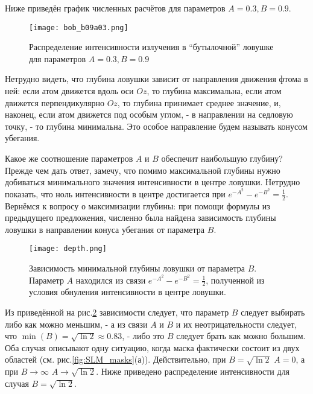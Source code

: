 \documentclass[12pt]{article}
\begin{document}
        Ниже приведён график численных расчётов для параметров $A = 0.3, B = 0.9$.
        \begin{figure}
            \center
            \texttt{[image: bob\_b09a03.png]}
            \caption{Распределение интенсивности излучения в \enquote{бутылочной} ловушке для параметров
                $A = 0.3, B = 0.9$}
            \label{fig:BOB a=0.3, b=0.9}
        \end{figure}
        Нетрудно видеть, что глубина ловушки зависит от направления движения фтома в ней: если атом движется вдоль
        оси $Oz$, то глубина максимальна, если атом движется перпендикулярно $Oz$, то глубина принимает среднее значение,
        и, наконец, если атом движется под особым углом, - в направлении на седловую точку, - то глубина минимальна.
        Это особое направление будем называть конусом убегания.

        Какое же соотношение параметров $A$ и $B$ обеспечит наибольшую глубину? Прежде чем дать ответ, замечу, что
        помимо максимальной глубины нужно добиваться минимального значения интенсивности в центре ловушки. Нетрудно показать,
        что ноль интенсивности в центре достигается при $e^{-A^2} - e^{-B^2}= \frac12$. Вернёмся к вопросу о максимизации
        глубины: при помощи формулы из предыдущего предложения, численно была найдена зависимость глубины ловушки
        в направлении конуса убегания от параметра $B$.

        \begin{figure}
            \center
            \texttt{[image: depth.png]}
            \caption{Зависимость минимальной глубины ловушки от параметра $B$. Параметр $A$ находился из связи
            $e^{-A^2} - e^{-B^2}= \frac12$, полученной из условия обнуления интенсивности в центре ловушки.}
            \label{fig:depth}
        \end{figure}

        Из приведённой на рис.\ref{fig:depth} зависимости следует, что параметр $B$ следует выбирать либо
        как можно меньшим, - а из связи $A$ и $B$ и их неотрицательности следует, что
        $\min{(B)}=\sqrt{\ln2} \approx 0.83$, - либо это $B$ следует брать как можно большим. Оба случая описывают одну
        ситуацию, когда маска фактически состоит из двух областей (см. рис.\ref{fig:SLM_masks}(а)). Действительно, при $B=\sqrt{\ln2}$ $A=0$,
        а при $B \rightarrow \infty$ $A \rightarrow \sqrt{\ln2}$. Ниже приведено распределение интенсивности для случая $B=\sqrt{\ln2}$.
\end{document}
